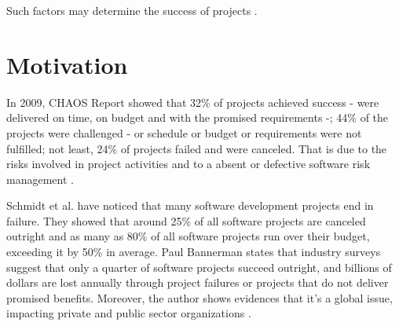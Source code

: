 Such factors may determine the success of projects \cite{HIGUERAHAIMES1996} \cite{PMBOK2008}.

\section{Motivation}

In 2009, CHAOS Report \cite{CHAOS2009} showed that 32\% of projects achieved success - were delivered on time, on budget and with the promised requirements -; 44\% of the projects were challenged - or schedule or budget or requirements were not fulfilled; not least, 24\% of projects failed and were canceled. That is due to the risks involved in project activities and to a absent or defective software risk management \cite{ISLAM2009}.

Schmidt et al. \cite{schmidt2001identifying} have noticed that many software development projects end in failure. They showed that around 25\% of all software projects are canceled outright and as many as 80\% of all software projects run over their budget, exceeding it by 50\% in average. Paul Bannerman \cite{bannerman2008risk} states that industry surveys suggest that only a quarter of software projects succeed outright, and billions of dollars are lost annually through project failures or projects that do not deliver promised benefits. Moreover, the author shows evidences that it's a global issue, impacting private and public sector organizations \cite{KPMG2005}.

